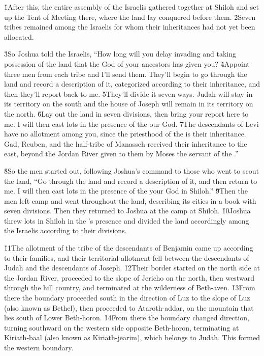 \v{1}After this, the entire assembly of the Israelis gathered together at Shiloh and set up the Tent of Meeting there, where the land lay conquered before them. \v{2}Seven tribes remained among the Israelis for whom their inheritances had not yet been allocated.

\v{3}So Joshua told the Israelis, ``How long will you delay invading and taking possession of the land that the  God of your ancestors has given you? \v{4}Appoint three men from each tribe and I'll send them. They'll begin to go through the land and record a description of it, categorized according to their inheritance, and then they'll report back to me. \v{5}They'll divide it seven ways. Judah will stay in its territory on the south and the house of Joseph will remain in its territory on the north. \v{6}Lay out the land in seven divisions, then bring your report here to me. I will then cast lots in the presence of the  our God. \v{7}The descendants of Levi have no allotment among you, since the priesthood of the  is their inheritance. Gad, Reuben, and the half-tribe of Manasseh received their inheritance to the east, beyond the Jordan River given to them by Moses the servant of the .''

\v{8}So the men started out, following Joshua's command to those who went to scout the land, ``Go through the land and record a description of it, and then return to me. I will then cast lots in the presence of the  your God in Shiloh.'' \v{9}Then the men left camp and went throughout the land, describing its cities in a book with seven divisions. Then they returned to Joshua at the camp at Shiloh. \v{10}Joshua threw lots in Shiloh in the 's presence and divided the land accordingly among the Israelis according to their divisions.

\v{11}The allotment of the tribe of the descendants of Benjamin came up according to their families, and their territorial allotment fell between the descendants of Judah and the descendants of Joseph. \v{12}Their border started on the north side at the Jordan River, proceeded to the slope of Jericho on the north, then westward through the hill country, and terminated at the wilderness of Beth-aven. \v{13}From there the boundary proceeded south in the direction of Luz to the slope of Luz (also known as Bethel), then proceeded to Ataroth-addar, on the mountain that lies south of Lower Beth-horon. \v{14}From there the boundary changed direction, turning southward on the western side opposite Beth-horon, terminating at Kiriath-baal (also known as Kiriath-jearim), which belongs to Judah. This formed the western boundary.

